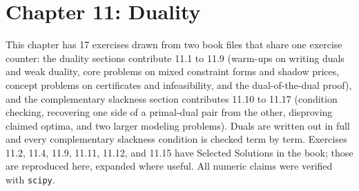 \section{Chapter 11: Duality}

This chapter has 17 exercises drawn from two book files that share one exercise counter: the duality sections contribute 11.1 to 11.9 (warm-ups on writing duals and weak duality, core problems on mixed constraint forms and shadow prices, concept problems on certificates and infeasibility, and the dual-of-the-dual proof), and the complementary slackness section contributes 11.10 to 11.17 (condition checking, recovering one side of a primal-dual pair from the other, disproving claimed optima, and two larger modeling problems). Duals are written out in full and every complementary slackness condition is checked term by term. Exercises 11.2, 11.4, 11.9, 11.11, 11.12, and 11.15 have Selected Solutions in the book; those are reproduced here, expanded where useful. All numeric claims were verified with \texttt{scipy}.

